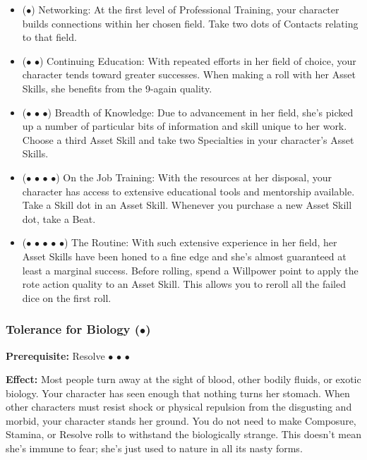 \documentclass["../Misguided by Starlight.tex"]{subfiles}
\begin{document}
			\begin{itemize}
				\item ($\bullet$) Networking: At the first level of Professional Training, your character builds connections within her chosen field. Take two dots of Contacts relating to that field.
				
				\item ($\bullet$ $\bullet$) Continuing Education: With repeated efforts in her field of choice, your character tends toward greater successes. When making a roll with her Asset Skills, she benefits from the 9-again quality.
				
				\item ($\bullet$ $\bullet$ $\bullet$) Breadth of Knowledge: Due to advancement in her field, she’s picked up a number of particular bits of information and skill unique to her work. Choose a third Asset Skill and take two Specialties in your character’s Asset Skills.
				
				\item ($\bullet$ $\bullet$ $\bullet$ $\bullet$) On the Job Training: With the resources at her disposal, your character has access to extensive educational tools and mentorship available. Take a Skill dot in an Asset Skill. Whenever you purchase a new Asset Skill dot, take a Beat.
				
				\item ($\bullet$ $\bullet$ $\bullet$ $\bullet$ $\bullet$) The Routine: With such extensive experience in her field, her Asset Skills have been honed to a fine edge and she’s almost guaranteed at least a marginal success. Before rolling, spend a Willpower point to apply the rote action quality to an Asset Skill. This allows you to reroll all the failed dice on the first roll.
			\end{itemize}
			
	
	\subsubsection{Tolerance for Biology ($\bullet$)} %
		\textbf{Prerequisite:} Resolve $\bullet$ $\bullet$ $\bullet$
		
		\textbf{Effect:} Most people turn away at the sight of blood, other bodily fluids, or exotic biology. Your character has seen enough that nothing turns her stomach. When other characters must resist shock or physical repulsion from the disgusting and morbid, your character stands her ground. You do not need to make Composure, Stamina, or Resolve rolls to withstand the biologically strange. This doesn’t mean she’s immune to fear; she’s just used to nature in all its nasty forms.
	
\end{document}
